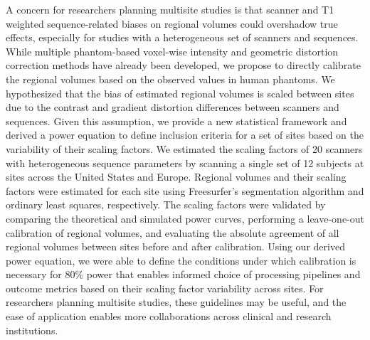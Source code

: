 
A concern for researchers planning multisite studies is that scanner and T1 weighted sequence-related biases on regional volumes could overshadow true effects, especially for studies with a heterogeneous set of scanners and sequences. While multiple phantom-based voxel-wise intensity and geometric distortion correction methods have already been developed, we propose to directly calibrate the regional volumes based on the observed values in human phantoms. We hypothesized that the bias of estimated regional volumes is scaled between sites due to the contrast and gradient distortion differences between scanners and sequences. Given this assumption, we provide a new statistical framework and derived a power equation to define inclusion criteria for a set of sites based on the variability of their scaling factors. We estimated the scaling factors of 20 scanners with heterogeneous sequence parameters by scanning a single set of 12 subjects at sites across the United States and Europe. Regional volumes and their scaling factors were estimated for each site using Freesurfer's segmentation algorithm and ordinary least squares, respectively. The scaling factors were validated by comparing the theoretical and simulated power curves, performing a leave-one-out calibration of regional volumes, and evaluating the absolute agreement of all regional volumes between sites before and after calibration. Using our derived power equation, we were able to define the conditions under which calibration is necessary for 80\% power that enables informed choice of processing pipelines and outcome metrics based on their scaling factor variability across sites. For researchers planning multisite studies, these guidelines may be useful, and the ease of application enables more collaborations across clinical and research institutions.